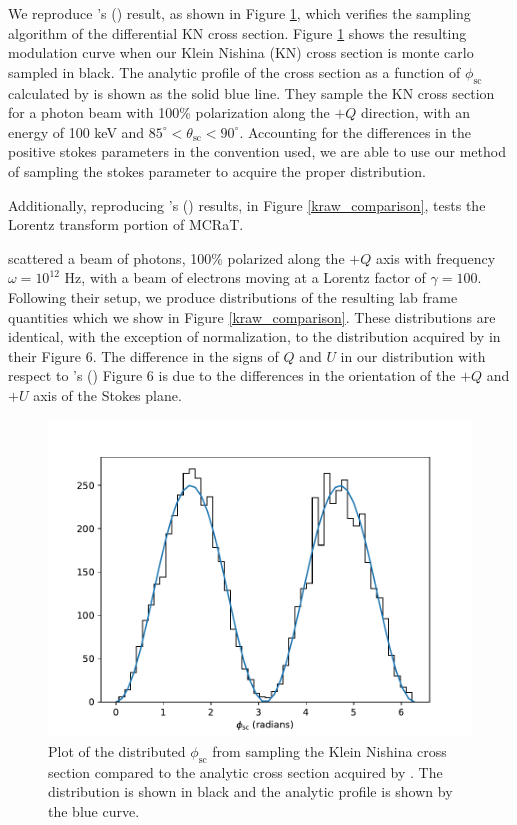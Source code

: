 \documentclass[12pt,a4paper]{article}
\begin{document}
{We reproduce \citeauthor{depaola2003new}'s  (\citeyear{depaola2003new}) result, as shown in Figure \ref{depaola_comparison},  which verifies the sampling algorithm of the differential KN cross section. Figure  \ref{depaola_comparison} shows the resulting modulation curve when our Klein Nishina (KN) cross section is monte carlo sampled in black. The analytic profile of the cross section as a function of $\phi_\mathrm{sc}$ calculated by \cite{depaola2003new} is shown as the solid blue line. They sample the KN cross section for a photon beam with 100\% polarization along the $+Q$ direction, with an energy of 100 keV and $85^\circ<\theta_\mathrm{sc}<90^\circ$. Accounting for the differences in the positive stokes parameters in the convention used, we are able to use our method of sampling the stokes parameter to acquire the proper distribution.


Additionally, reproducing \citeauthor{krawczynski2011polarization}'s  (\citeyear{krawczynski2011polarization}) results, in Figure \ref{kraw_comparison}, tests the Lorentz transform portion of MCRaT.} \cite{krawczynski2011polarization} scattered a beam of photons, 100\% polarized along the $+Q$ axis with frequency $\omega=10^{12}$ Hz, with a beam of electrons moving at a Lorentz factor of $\gamma=100$. Following their setup, we produce distributions of the resulting lab frame quantities which we show in Figure \ref{kraw_comparison}. These distributions are identical, with the exception of normalization, to the distribution acquired by \cite{krawczynski2011polarization} in their Figure 6. The difference in the signs of $Q$ and $U$ in our distribution with respect to \citeauthor{krawczynski2011polarization}'s (\citeyear{krawczynski2011polarization}) Figure 6 is due to the differences in the orientation of the $+Q$ and $+U$ axis of the Stokes plane.

\begin{figure}[h!]
 \centering
 \includegraphics[]{phi_sampling_depaola}
 \caption{Plot of the distributed $\phi_\mathrm{sc}$ from sampling the Klein Nishina cross section compared to the analytic cross section acquired by \cite{depaola2003new}. The distribution is shown in black and the analytic profile is shown by the blue curve.}
 \label{depaola_comparison}
 \end{figure}
\end{document}

